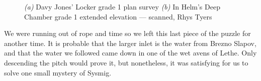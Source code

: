     \begin{figure}[t!]
        \checkoddpage \ifoddpage \forcerectofloat \else \forceversofloat \fi
        \centering
        \begin{subfigure}[t]{0.41\textwidth}
            \centering
            \caption{}\label{davyjones}
        \end{subfigure}
        \hfill
        \begin{subfigure}[t]{0.58\textwidth}
            \centering
            \caption{} \label{helmsdeep}
        \end{subfigure}

        \caption{
            \emph{(a)} Davy Jones' Locker grade 1 plan survey 
            \emph{(b)} In Helm's Deep Chamber grade 1 extended elevation --- scanned, Rhys Tyers 
        }
    \end{figure}


    We were running out of rope and time so we left this last piece of the puzzle for another time. It is probable that the larger inlet is the water from Brezno Slapov, and that the water we followed came down in one of the wet avens of Lethe. Only descending the pitch would prove it, but nonetheless, it was satisfying for us to solve one small mystery of Sysmig.
